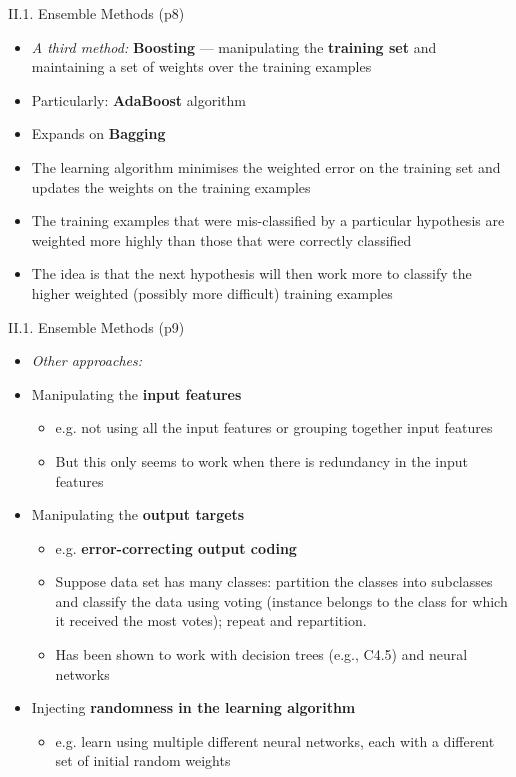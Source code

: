 \documentclass[handout]{beamer}
\newcommand{\strong}[1]{\textbf{\color{teal} #1}}
\newcommand{\stronger}[1]{\textbf{\color{purple} #1}}
\begin{document}
\begin{frame}{II.1. Ensemble Methods (p8)}
\begin{itemize}
\item[] \emph{A third method:} \stronger{Boosting} --- manipulating the \strong{training set} and maintaining a set of weights over the training examples
\item Particularly: \stronger{AdaBoost} algorithm \cite{freund-schapire:1997}
\item Expands on \strong{Bagging}
\item The learning algorithm minimises the weighted error on the training set
and updates the weights on the training examples
\item The training examples that were mis-classified by a particular hypothesis are weighted more highly than those that were correctly classified
\item The idea is that the next hypothesis will then work more to classify the higher weighted (possibly more difficult) training examples
\end{itemize}
\end{frame}
\begin{frame}{II.1. Ensemble Methods (p9)}
\begin{itemize}
\item[] \emph{Other approaches:}
\item Manipulating the \strong{input features}
	\begin{itemize}
	\item e.g. not using all the input features or grouping together input features
	\item But this only seems to work when there is redundancy in the input features
	\end{itemize}
\item Manipulating the \strong{output targets}
	\begin{itemize}
	\item e.g. \stronger{error-correcting output coding}
	\item Suppose data set has many classes: partition the classes into subclasses and classify the data using voting (instance belongs to the class for which it received the most votes); repeat and repartition.
	\item Has been shown to work with decision trees (e.g., C4.5) and neural networks
	\end{itemize}
\item Injecting \strong{randomness in the learning algorithm}
	\begin{itemize}
	\item e.g. learn using multiple different neural networks, each with a different set of initial random weights
	\end{itemize}
\end{itemize}
\end{frame}
\end{document}
